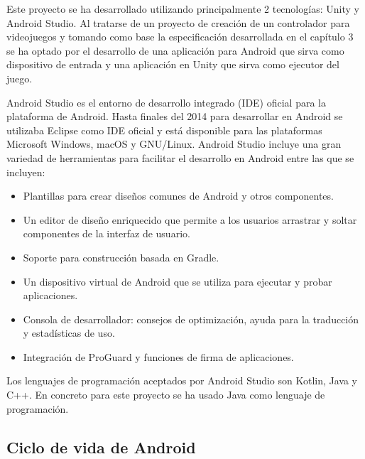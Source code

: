 Este proyecto se ha desarrollado utilizando principalmente 2 tecnolog\'ias: Unity y Android Studio. Al tratarse de un proyecto de creaci\'on de un controlador para videojuegos y tomando como base la especificaci\'on desarrollada en el cap\'itulo 3 se ha optado por el desarrollo de una aplicaci\'on para Android que sirva como dispositivo de entrada y una aplicaci\'on en Unity que sirva como ejecutor del juego.

Android Studio es el entorno de desarrollo integrado (IDE) oficial para la plataforma de Android. Hasta finales del 2014 para desarrollar en Android se utilizaba Eclipse como IDE oficial y est\'a disponible para las plataformas Microsoft Windows, macOS y GNU/Linux. Android Studio incluye una gran variedad de herramientas para facilitar el desarrollo en Android entre las que se incluyen:

\begin {itemize}
\item Plantillas para crear dise\~nos comunes de Android y otros componentes.
\item Un editor de dise\~no enriquecido que permite a los usuarios arrastrar y soltar componentes de la interfaz de usuario.
\item Soporte para construcci\'on basada en Gradle.
\item Un dispositivo virtual de Android que se utiliza para ejecutar y probar aplicaciones.
\item Consola de desarrollador: consejos de optimizaci\'on, ayuda para la traducci\'on y estad\'isticas de uso.
\item Integraci\'on de ProGuard y funciones de firma de aplicaciones.
\end {itemize}
 
Los lenguajes de programaci\'on aceptados por Android Studio son Kotlin, Java y C++. En concreto para este proyecto se ha usado Java como lenguaje de programaci\'on.

\subsection {Ciclo de vida de Android}


